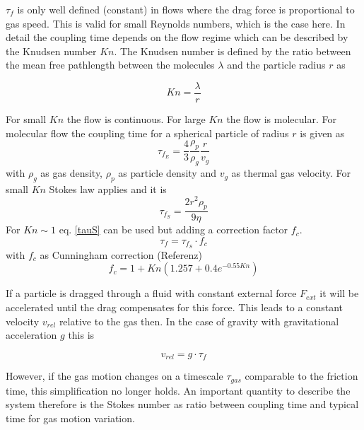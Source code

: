 $\tau_f$ is only well defined (constant) in flows where the drag force is proportional to gas speed. This is valid for small Reynolds numbers, which is the case here. In detail the coupling time depends on the flow regime which can be described by the Knudsen number $Kn$.
The Knudsen number is defined by the ratio between the mean free pathlength between the molecules $\lambda$ and the particle radius $r$ as

\begin{equation}
Kn = \frac{\lambda}{r}
\label{tau_no}
\end{equation}

For small $Kn$ the flow is continuous. For large $Kn$ the flow is molecular.
For molecular flow the coupling time for a spherical particle of radius $r$ is given as
\begin{equation}
\tau_{f_E} = \frac{4}{3} \frac{\rho_p}{\rho_g} \frac{r}{v_g}
\label{tau0}
\end{equation}
with $\rho_g$ as gas density, $\rho_p$ as particle density and $v_g$ as thermal gas velocity. 
For small $Kn$ Stokes law applies and it is
\begin{equation}
\tau_{f_S} = \frac{2 r^2 \rho_p}{9 \eta} 
\label{tauS}
\end{equation}
For $Kn \sim 1$ eq. \ref{tauS} can be used but adding a correction factor $f_c$.
\begin{equation}
\tau_f = \tau_{f_S} \cdot f_c
\label{tau}
\end{equation}
with $f_c$ as Cunningham correction (Referenz)
\begin{equation}
f_c = 1+Kn(1.257+0.4e^{-0.55 Kn})
\end{equation}


If a particle is dragged through a fluid with constant external force $F_{ext}$ it will be accelerated until the drag compensates for this force.
This leads to a constant velocity $v_{rel}$ relative to the gas then. In the case of gravity with gravitational acceleration $g$ this is

\begin{equation}
v_{rel} = g \cdot \tau_f
\label{vrel}
\end{equation}

However, if the gas motion changes on a timescale $\tau_{gas}$ comparable to the friction time, this simplification no longer holds. An important quantity to describe the system therefore is the Stokes number as ratio between coupling time and typical time for gas motion variation.


